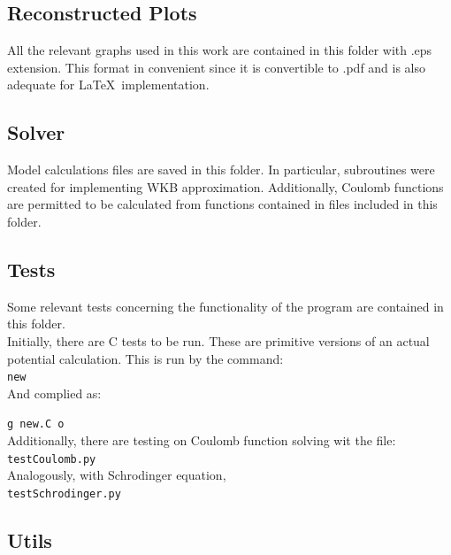 \documentclass[openany]{book}
\begin{document}
\subsection{Reconstructed Plots} \label{sub:codesReconstructedPlots}

All the relevant graphs used in this work are contained in this folder with .eps extension. This format in convenient since it is convertible to .pdf and is also adequate for \LaTeX  \ implementation.


\subsection{Solver} \label{sub:codesSolver}

Model calculations files are saved in this folder. In particular, subroutines were created for implementing WKB approximation. Additionally, Coulomb functions are permitted to be calculated from functions contained in files included in this folder.

\subsection{Tests} \label{sub:codesTests}

Some relevant tests concerning the functionality of the program are contained in this folder. \\

Initially, there are C tests to be run. These are primitive versions of an actual potential calculation. This is run by the command: \\

\texttt{new} \\

And complied as: 

\texttt{g new.C o} \\

Additionally, there are testing on Coulomb function solving wit the file: \\

\texttt{testCoulomb.py} \\

Analogously, with Schrodinger equation, \\

\texttt{testSchrodinger.py} \\


\subsection{Utils} \label{sub:codesUtils}
\end{document}
